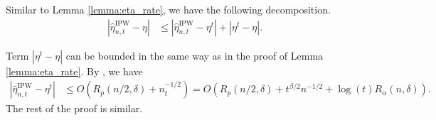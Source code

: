 Similar to Lemma \ref{lemma:eta_rate}, we have the following decomposition.
\begin{align*}
  | \hat{\eta}_{n, t}^{\text{IPW}} - \eta | & \leqslant | \hat{\eta}_{n,
  t}^{\text{IPW}} - \eta^t | + | \eta^t - \eta |.
\end{align*}

Term $| \eta^t - \eta |$ can be bounded in the same way as in the proof of
Lemma \ref{lemma:eta_rate}. By \cite[Theorem 1]{su2023estimated}, we have
\begin{align*}
  | \hat{\eta}_{n, t}^{\text{IPW}} - \eta^t | & \leqslant O (R_p (n/2, \delta) +
  n_t^{- 1 / 2}) = O (R_p (n/2, \delta) + t^{\beta / 2} n^{- 1 / 2}  + \log (t) R_{\alpha} (n,\delta)) .
\end{align*}
The rest of the proof is similar.   
